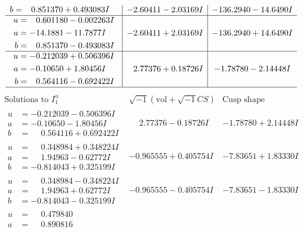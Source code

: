 \documentclass[1p]{elsarticle_modified}
\theoremstyle{definition}
\newcommand{\I}{\sqrt{-1}}
\begin{document}
$$\begin{array}{c|c|c}
\begin{aligned}
b &= \phantom{-}0.851370 + 0.493083 I\end{aligned}
 & -2.60411 - 2.03169 I & -136.2940 - 14.6490 I \\ \hline\begin{aligned}
u &= \phantom{-}0.601180 - 0.002263 I \\
a &= -14.1881 - 11.7877 I \\
b &= \phantom{-}0.851370 - 0.493083 I\end{aligned}
 & -2.60411 + 2.03169 I & -136.2940 + 14.6490 I \\ \hline\begin{aligned}
u &= -0.212039 + 0.506396 I \\
a &= -0.10650 + 1.80456 I \\
b &= \phantom{-}0.564116 - 0.692422 I\end{aligned}
 & \phantom{-}2.77376 + 0.18726 I & -1.78780 - 2.14448 I\\
 \hline 
 \end{array}$$\newpage$$\begin{array}{c|c|c}  
\text{Solutions to }I^u_{1}& \I (\text{vol} + \sqrt{-1}CS) & \text{Cusp shape}\\
 \hline 
\begin{aligned}
u &= -0.212039 - 0.506396 I \\
a &= -0.10650 - 1.80456 I \\
b &= \phantom{-}0.564116 + 0.692422 I\end{aligned}
 & \phantom{-}2.77376 - 0.18726 I & -1.78780 + 2.14448 I \\ \hline\begin{aligned}
u &= \phantom{-}0.348984 + 0.348224 I \\
a &= \phantom{-}1.94963 - 0.62772 I \\
b &= -0.814043 + 0.325199 I\end{aligned}
 & -0.965555 + 0.405754 I & -7.83651 + 1.83330 I \\ \hline\begin{aligned}
u &= \phantom{-}0.348984 - 0.348224 I \\
a &= \phantom{-}1.94963 + 0.62772 I \\
b &= -0.814043 - 0.325199 I\end{aligned}
 & -0.965555 - 0.405754 I & -7.83651 - 1.83330 I \\ \hline\begin{aligned}
u &= \phantom{-}0.479840\phantom{ +0.000000I} \\
a &= \phantom{-}0.890816\phantom{ +0.000000I} \\

\end{aligned}
\end{array}$$
\end{document}
